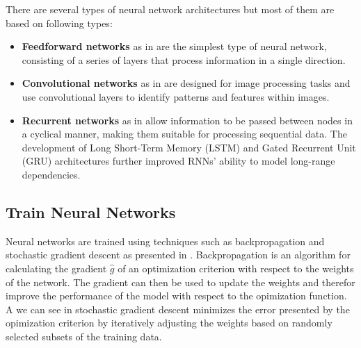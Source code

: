 There are several types of neural network architectures but most of them are based on following types: 
\begin{itemize}
	\item \textbf{Feedforward networks} as in  are the simplest type of neural network, consisting of a series of layers that process information in a single direction.
	\item \textbf{Convolutional networks} as in  are designed for image processing tasks and use convolutional layers to identify patterns and features within images. 
	\item \textbf{Recurrent networks} as in allow information to be passed between nodes in a cyclical manner, making them suitable for processing sequential data. The development of Long Short-Term Memory (LSTM) and Gated Recurrent Unit (GRU) architectures further improved RNNs' ability to model long-range dependencies.
\end{itemize}


\subsection{Train Neural Networks}

Neural networks are trained using techniques such as backpropagation and stochastic gradient descent as presented in . Backpropagation is an algorithm for calculating the gradient $\hat{g}$ of an optimization criterion with respect to the weights of the network. The gradient can then be used to update the weights and therefor improve the performance of the model with respect to the opimization function. A we can see in  stochastic gradient descent minimizes the error presented by the opimization criterion by iteratively adjusting the weights based on randomly selected subsets of the training data. 




